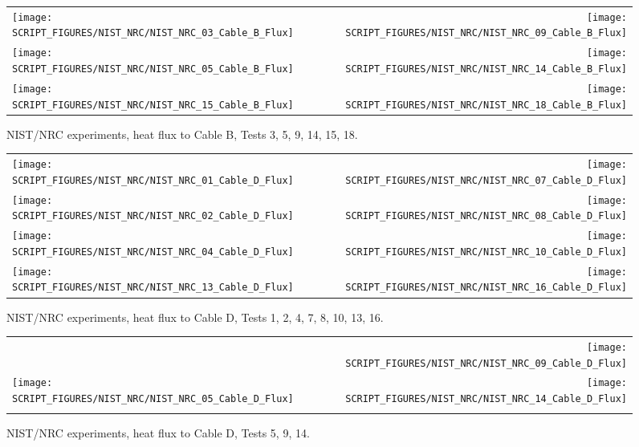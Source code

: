 \begin{figure}[p]
\begin{tabular*}{\textwidth}{l@{\extracolsep{\fill}}r}
\texttt{[image: SCRIPT\_FIGURES/NIST\_NRC/NIST\_NRC\_03\_Cable\_B\_Flux]} &
\texttt{[image: SCRIPT\_FIGURES/NIST\_NRC/NIST\_NRC\_09\_Cable\_B\_Flux]} \\
\texttt{[image: SCRIPT\_FIGURES/NIST\_NRC/NIST\_NRC\_05\_Cable\_B\_Flux]} &
\texttt{[image: SCRIPT\_FIGURES/NIST\_NRC/NIST\_NRC\_14\_Cable\_B\_Flux]} \\
\texttt{[image: SCRIPT\_FIGURES/NIST\_NRC/NIST\_NRC\_15\_Cable\_B\_Flux]} &
\texttt{[image: SCRIPT\_FIGURES/NIST\_NRC/NIST\_NRC\_18\_Cable\_B\_Flux]}
\end{tabular*}
\caption[NIST/NRC experiments, heat flux to Cable B, Tests 3, 5, 9, 14, 15, 18]
{NIST/NRC experiments, heat flux to Cable B, Tests 3, 5, 9, 14, 15, 18.}
\label{NIST_NRC_Cable_B_Flux_Open}
\end{figure}

\begin{figure}[p]
\begin{tabular*}{\textwidth}{l@{\extracolsep{\fill}}r}
\texttt{[image: SCRIPT\_FIGURES/NIST\_NRC/NIST\_NRC\_01\_Cable\_D\_Flux]} &
\texttt{[image: SCRIPT\_FIGURES/NIST\_NRC/NIST\_NRC\_07\_Cable\_D\_Flux]} \\
\texttt{[image: SCRIPT\_FIGURES/NIST\_NRC/NIST\_NRC\_02\_Cable\_D\_Flux]} &
\texttt{[image: SCRIPT\_FIGURES/NIST\_NRC/NIST\_NRC\_08\_Cable\_D\_Flux]} \\
\texttt{[image: SCRIPT\_FIGURES/NIST\_NRC/NIST\_NRC\_04\_Cable\_D\_Flux]} &
\texttt{[image: SCRIPT\_FIGURES/NIST\_NRC/NIST\_NRC\_10\_Cable\_D\_Flux]} \\
\texttt{[image: SCRIPT\_FIGURES/NIST\_NRC/NIST\_NRC\_13\_Cable\_D\_Flux]} &
\texttt{[image: SCRIPT\_FIGURES/NIST\_NRC/NIST\_NRC\_16\_Cable\_D\_Flux]}
\end{tabular*}
\caption[NIST/NRC experiments, heat flux to Cable D, Tests 1, 2, 4, 7, 8, 10, 13, 16]
{NIST/NRC experiments, heat flux to Cable D, Tests 1, 2, 4, 7, 8, 10, 13, 16.}
\label{NIST_NRC_Cable_D_Flux_Closed}
\end{figure}

\begin{figure}[p]
\begin{tabular*}{\textwidth}{l@{\extracolsep{\fill}}r}
                           &
\texttt{[image: SCRIPT\_FIGURES/NIST\_NRC/NIST\_NRC\_09\_Cable\_D\_Flux]} \\
\texttt{[image: SCRIPT\_FIGURES/NIST\_NRC/NIST\_NRC\_05\_Cable\_D\_Flux]} &
\texttt{[image: SCRIPT\_FIGURES/NIST\_NRC/NIST\_NRC\_14\_Cable\_D\_Flux]} \\
                      &
\end{tabular*}
\caption[NIST/NRC experiments, heat flux to Cable D, Tests 5, 9, 14]
{NIST/NRC experiments, heat flux to Cable D, Tests 5, 9, 14.}
\label{NIST_NRC_Cable_D_Flux_Open}
\end{figure}

